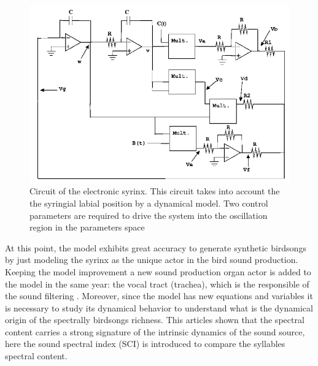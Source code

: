 \begin{figure}[H]
    \centering
    \includegraphics[width=0.7\linewidth]{Images/electronic_syrinx.png}
    \caption{Circuit of the electronic syrinx. This circuit takes into account the the syringial labial position by a dynamical model. Two control parameters are required to drive the system into the oscillation region in the parameters space \cite{electronic_syrinx} }
    \label{fig:electronic_syrinx}
\end{figure}


At this point, the model exhibits great accuracy to generate synthetic birdsongs by just modeling the syrinx as the unique actor in the bird sound production. Keeping the model improvement a new sound production organ actor is added to the model in the same year: the vocal tract (trachea), which is the responsible of the sound filtering \cite{source-source}. Moreover, since the model has new equations and variables it is necessary to study its dynamical behavior to understand what is the dynamical origin of the spectrally birdsongs richness. This articles shown that the spectral content carries a strong signature of the intrinsic dynamics of the sound source, here the sound spectral index (SCI) is introduced to compare the syllables spectral content.\cite{rich}


